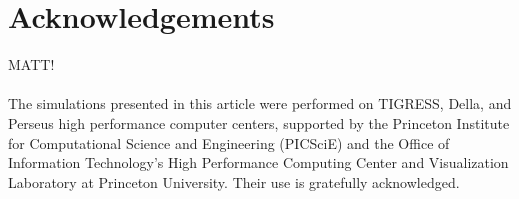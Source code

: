 \chapter{Acknowledgements}
MATT!\\
\\
The simulations presented in this article were performed on TIGRESS, Della, and Perseus high performance computer centers, supported by the Princeton Institute for Computational Science and Engineering (PICSciE) and the Office of Information Technology's High Performance Computing Center and Visualization Laboratory at Princeton University. Their use is gratefully acknowledged. 

